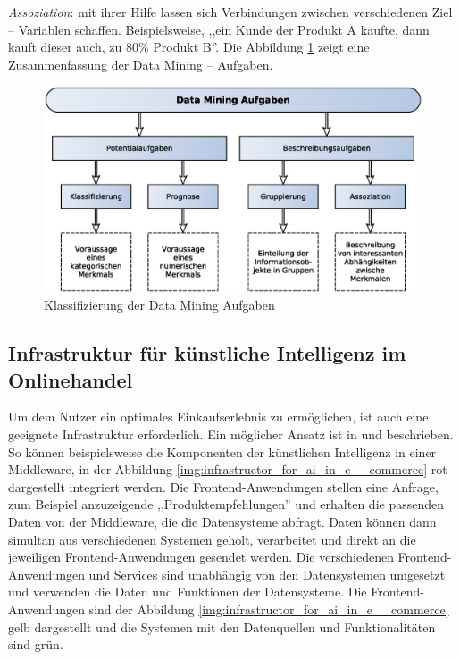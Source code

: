\textit{Assoziation}: mit ihrer Hilfe lassen sich Verbindungen zwischen verschiedenen Ziel – Variablen schaffen. Beispielsweise, ,,ein Kunde der Produkt A kaufte, dann kauft dieser auch, zu 80\% Produkt B''. Die Abbildung \ref{img:classification_data_mining_tasks} zeigt eine Zusammenfassung der Data Mining – Aufgaben.

\begin{figure}[!ht]
	\centering
	\includegraphics[width=\linewidth]{images/classification_data_mining_tasks.eps}
	\caption{Klassifizierung der Data Mining Aufgaben}
	\label{img:classification_data_mining_tasks}
\end{figure}

\subsection{Infrastruktur für künstliche Intelligenz im Onlinehandel}
Um dem Nutzer ein optimales Einkaufserlebnis zu ermöglichen, ist auch eine geeignete Infrastruktur erforderlich. Ein möglicher Ansatz ist in \cite{netz98_headless_commerce} und \cite{perske_headless_commerce} beschrieben. So können beispielsweise die Komponenten der künstlichen Intelligenz in einer Middleware, in der Abbildung \ref{img:infrastructor_for_ai_in_e__commerce} rot dargestellt integriert werden. Die Frontend-Anwendungen stellen eine Anfrage, zum Beispiel anzuzeigende ,,Produktempfehlungen'' und erhalten die passenden Daten von der Middleware, die die Datensysteme abfragt. Daten können dann simultan aus verschiedenen Systemen geholt, verarbeitet und direkt an die jeweiligen Frontend-Anwendungen gesendet werden. Die verschiedenen Frontend-Anwendungen und Services sind unabhängig von den Datensystemen umgesetzt und verwenden die Daten und Funktionen der Datensysteme. Die Frontend-Anwendungen sind der Abbildung \ref{img:infrastructor_for_ai_in_e__commerce} gelb dargestellt und die Systemen mit den Datenquellen und Funktionalitäten sind grün.


